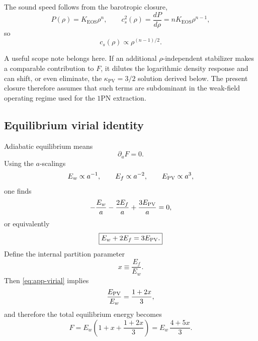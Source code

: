 \documentclass[11pt]{article}
\newcommand{\kPV}{\kappa_{\mathrm{PV}}}
\newcommand{\KEOS}{K_{\mathrm{EOS}}}
\begin{document}
The sound speed follows from the barotropic closure,
\begin{equation}
P(\rho)=\KEOS \rho^n,
\qquad
c_s^2(\rho)=\frac{dP}{d\rho}=n\KEOS \rho^{n-1},
\label{eq:app-cs-polytrope}
\end{equation}
so
\begin{equation}
c_s(\rho)\propto \rho^{(n-1)/2}.
\label{eq:app-cs-scaling}
\end{equation}

A useful scope note belongs here. If an additional \(\rho\)-independent stabilizer makes a
comparable contribution to \(F\), it dilutes the logarithmic density response and can
shift, or even eliminate, the \(\kPV=3/2\) solution derived below. The present closure
therefore assumes that such terms are subdominant in the weak-field operating regime used
for the \(1\)PN extraction.

\subsection{Equilibrium virial identity}
\label{app:adiabatic-virial}

Adiabatic equilibrium means
\begin{equation}
\partial_a F=0.
\label{eq:app-equilibrium-condition}
\end{equation}
Using the \(a\)-scalings
\begin{equation}
E_w\propto a^{-1},
\qquad
E_f\propto a^{-2},
\qquad
E_{\rm PV}\propto a^{3},
\label{eq:app-a-scalings}
\end{equation}
one finds
\begin{equation}
-\frac{E_w}{a}-\frac{2E_f}{a}+\frac{3E_{\rm PV}}{a}=0,
\end{equation}
or equivalently
\begin{equation}
\boxed{
E_w+2E_f=3E_{\rm PV}.
}
\label{eq:app-virial}
\end{equation}
Define the internal partition parameter
\begin{equation}
x\equiv \frac{E_f}{E_w}.
\label{eq:app-x-def}
\end{equation}
Then \eqref{eq:app-virial} implies
\begin{equation}
\frac{E_{\rm PV}}{E_w}=\frac{1+2x}{3},
\label{eq:app-EPV-over-Ew}
\end{equation}
and therefore the total equilibrium energy becomes
\begin{equation}
F
=
E_w\left(1+x+\frac{1+2x}{3}\right)
=
E_w\,\frac{4+5x}{3}.
\label{eq:app-F-in-x}
\end{equation}
\end{document}
